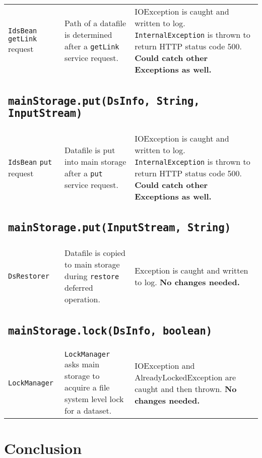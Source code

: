 \documentclass[paper=a4]{scrartcl}
\begin{document}
\begin{longtable}{ p{32mm} | p{48mm} | p{48mm} }
    \raggedright \texttt{IdsBean} \texttt{getLink} request &
    \raggedright Path of a datafile is determined after a \texttt{getLink} service request. &
    \raggedright IOException is caught and written to log. \texttt{InternalException} is thrown to return HTTP status code 500. \textbf{Could catch other Exceptions as well.}
    \tabularnewline

    \multicolumn{3}{p{\textwidth}}{
      \subsection{\texttt{mainStorage.put(DsInfo, String, InputStream)}}
    } \\

    \raggedright \texttt{IdsBean} \texttt{put} request &
    \raggedright Datafile is put into main storage after a \texttt{put} service request. &
    \raggedright IOException is caught and written to log. \texttt{InternalException} is thrown to return HTTP status code 500. \textbf{Could catch other Exceptions as well.}
    \tabularnewline

    \multicolumn{3}{p{\textwidth}}{
      \subsection{\texttt{mainStorage.put(InputStream, String)}}
    } \\

    \raggedright \texttt{DsRestorer} &
    \raggedright Datafile is copied to main storage during \texttt{restore} deferred operation. &
    \raggedright Exception is caught and written to log. \textbf{No changes needed.}
    \tabularnewline

    \multicolumn{3}{p{\textwidth}}{
      \subsection{\texttt{mainStorage.lock(DsInfo, boolean)}}
    } \\

    \texttt{LockManager} &
    \raggedright \texttt{LockManager} asks main storage to acquire a file system level lock for a dataset. &
    \raggedright IOException and AlreadyLockedException are caught and then thrown. \textbf{No changes needed.}
    \tabularnewline

\end{longtable}

\pagebreak


\section{Conclusion}
\end{document}
